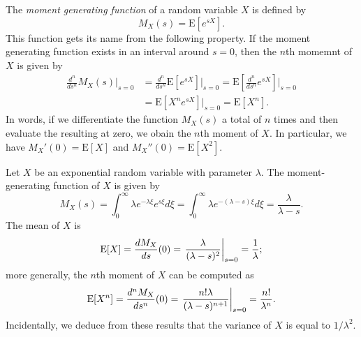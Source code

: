 The \emph{moment generating function} of a random variable $X$ is defined by
\begin{equation*}
M_X (s) = \mathrm{E} \left[ e^{s X} \right] .
\end{equation*}
This function gets its name from the following property.
If the moment generating function exists in an interval around $s = 0$, then the $n$th momemnt of $X$ is given by
\begin{equation*}
\begin{split}
\frac{d^n}{ds^n} M_X (s) \Big|_{s=0}
&= \frac{d^n}{ds^n} \mathrm{E} \left[ e^{s X} \right] \Big|_{s=0}
= \mathrm{E} \left[ \frac{d^n}{ds^n} e^{s X} \right] \bigg|_{s=0} \\
&= \mathrm{E} \left[ X^n e^{s X} \right] \Big|_{s=0}
= \mathrm{E} [X^n] .
\end{split}
\end{equation*}
In words, if we differentiate the function $M_X(s)$ a total of $n$ times and then evaluate the resulting at zero, we obain the $n$th moment of $X$.
In particular, we have $M_X'(0) = \mathrm{E} [X]$ and $M_X''(0) = \mathrm{E} [X^2]$.

\begin{example}
Let $X$ be an exponential random variable with parameter $\lambda$.
The moment-generating function of $X$ is given by
\begin{equation*}
M_X (s) = \int_0^{\infty} \lambda e^{-\lambda \xi} e^{s\xi} d\xi
= \int_0^{\infty} \lambda e^{-(\lambda-s) \xi} d\xi
= \frac{\lambda}{\lambda - s} .
\end{equation*}
The mean of $X$ is
\begin{equation*}
\mathrm{E} [X] = \frac{d M_X }{ds} (0)
= \left. \frac{\lambda}{(\lambda - s)^2} \right|_{s=0}
= \frac{1}{\lambda} ;
\end{equation*}
more generally, the $n$th moment of $X$ can be computed as
\begin{equation*}
\mathrm{E} [X^n] = \frac{d^n M_X }{ds^n} (0)
= \left. \frac{n! \lambda}{(\lambda - s)^{n+1}} \right|_{s=0}
= \frac{n!}{\lambda^n} .
\end{equation*}
Incidentally, we deduce from these results that the variance of $X$ is equal to $1/\lambda^2$.
\end{example}

